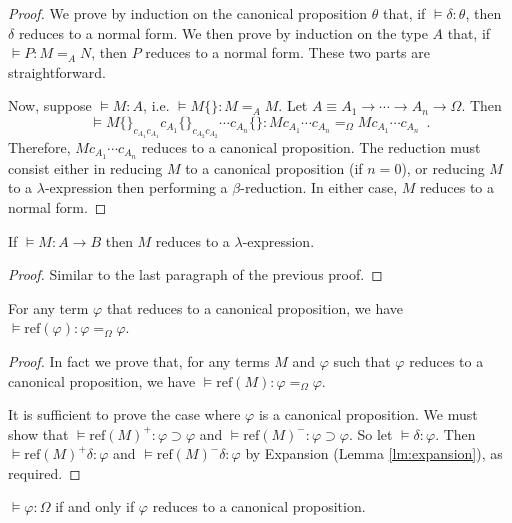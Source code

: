 \documentclass[a4paper,UKenglish]{lipics-v2016}
\newcommand*{\reff}[1]{\ensuremath{\mathrm{ref} \left( {#1} \right)}}
\theoremstyle{plain}
\theoremstyle{definition}
\begin{document}
\begin{proof}
We prove by induction on the canonical proposition $\theta$ that, if $\models \delta : \theta$, then $\delta$ reduces to a normal form.
We then prove by induction on the type $A$ that, if $\models P : M =_A N$, then $P$ reduces to a normal form.  These two parts are straightforward.

Now, suppose $\models M : A$, i.e. $\models M \{\} : M =_A M$.  Let $A \equiv A_1 \rightarrow \cdots \rightarrow A_n \rightarrow \Omega$.  Then
\[ \models M \{\}_{c_{A_1} c_{A_1}} c_{A_1} \{\}_{c_{A_2} c_{A_2}} \cdots c_{A_n} \{\}
: M c_{A_1} \cdots c_{A_n} =_\Omega M c_{A_1} \cdots c_{A_n} \enspace . \]
Therefore, $M c_{A_1} \cdots c_{A_n}$ reduces to a canonical proposition.  The reduction must consist either in reducing $M$ to a canonical proposition (if $n = 0$),
or reducing $M$ to a $\lambda$-expression then performing a $\beta$-reduction.  In either case, $M$ reduces to a normal form.
\end{proof}

\begin{lemma}
\label{lm:pre-ref-compute}
If $\models M : A \rightarrow B$ then $M$ reduces to a $\lambda$-expression.
\end{lemma}

\begin{proof}
Similar to the last paragraph of the previous proof.
\end{proof}

\begin{lemma}
\label{lm:ref-compute-Omega}
For any term $\varphi$ that reduces to a canonical proposition, we have $\models \reff{\varphi} : \varphi =_\Omega \varphi$.
\end{lemma}

\begin{proof}
In fact we prove that, for any terms $M$ and $\varphi$ such that $\varphi$ reduces to a canonical proposition, we have
$\models \reff{M} : \varphi =_\Omega \varphi$.

It is sufficient to prove the case where $\varphi$ is a canonical proposition.
We must show that $\models \reff{M}^+ : \varphi \supset \varphi$ and $\models \reff{M}^- : \varphi \supset \varphi$.  So let $\models \delta : \varphi$.
Then $\models \reff{M}^+ \delta : \varphi$ and $\models \reff{M}^- \delta : \varphi$ by Expansion (Lemma \ref{lm:expansion}), as required.
\end{proof}

\begin{lemma}
$\models \varphi : \Omega$ if and only if $\varphi$ reduces to a canonical proposition.
\end{lemma}
\end{document}

